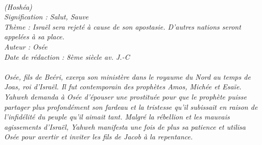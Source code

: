 \BFont
\noindent\hrulefill
{\footnotesize
\textit{
\bigskip
{\centering{}
\\(Hoshéa)
\\Signification : Salut, Sauve
\\Thème : Israël sera rejeté à cause de son apostasie. D’autres nations seront appelées à sa place.
\\Auteur : Osée
\\Date de rédaction : 8ème  siècle av. J.-C\\}
}
\textit{
\\Osée, fils de Beéri, exerça son ministère dans le royaume du Nord au temps de Joas, roi d’Israël. Il fut contemporain des prophètes Amos, Michée et Esaïe.
\\Yahweh demanda à Osée d’épouser une prostituée pour que le prophète puisse partager plus profondément son fardeau et la tristesse qu’il subissait en raison de l’infidélité du peuple qu’il aimait tant. Malgré la rébellion et les mauvais agissements d’Israël, Yahweh manifesta une fois de plus sa patience et utilisa Osée pour avertir et inviter les fils de Jacob à la repentance.\bigskip
}
}
\par\nobreak\noindent\hrulefill
